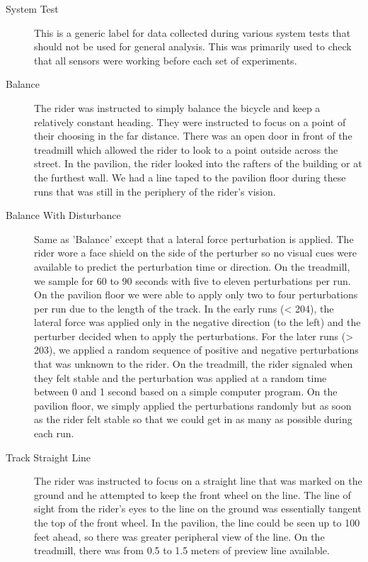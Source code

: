 \documentclass{article}
\begin{document}
\begin{description}
  \item[System Test]
     This is a generic label for data collected during various system tests
     that should not be used for general analysis. This was primarily used to
     check that all sensors were working before each set of experiments.
  \item[Balance] The rider was instructed to simply balance the bicycle and keep
    a relatively constant heading. They were instructed to focus on a point of
    their choosing in the far distance. There was an open door in front of the
    treadmill which allowed the rider to look to a point outside across the
    street. In the pavilion, the rider looked into the rafters of the building
    or at the furthest wall. We had a line taped to the pavilion floor during
    these runs that was still in the periphery of the rider's vision.
  \item[Balance With Disturbance] Same as 'Balance' except that a lateral force
    perturbation is applied. The rider wore a face shield on the side of the
    perturber so no visual cues were available to predict the perturbation time
    or direction. On the treadmill, we sample for 60 to 90 seconds with five to
    eleven perturbations per run. On the pavilion floor we were able to apply
    only two to four perturbations per run due to the length of the track. In
    the early runs (< 204), the lateral force was applied only in the negative
    direction (to the left) and the perturber decided when to apply the
    perturbations. For the later runs (> 203), we applied a random sequence of
    positive and negative perturbations that was unknown to the rider. On the
    treadmill, the rider signaled when they felt stable and the perturbation
    was applied at a random time between 0 and 1 second based on a simple
    computer program. On the pavilion floor, we simply applied the
    perturbations randomly but as soon as the rider felt stable so that we
    could get in as many as possible during each run.
  \item[Track Straight Line] The rider was instructed to focus on a straight
    line that was marked on the ground and he attempted to keep the front wheel
    on the line. The line of sight from the rider's eyes to the line on the
    ground was essentially tangent the top of the front wheel. In the pavilion,
    the line could be seen up to 100 feet ahead, so there was greater
    peripheral view of the line. On the treadmill, there was from 0.5 to 1.5
    meters of preview line available.

\end{description}
\end{document}

